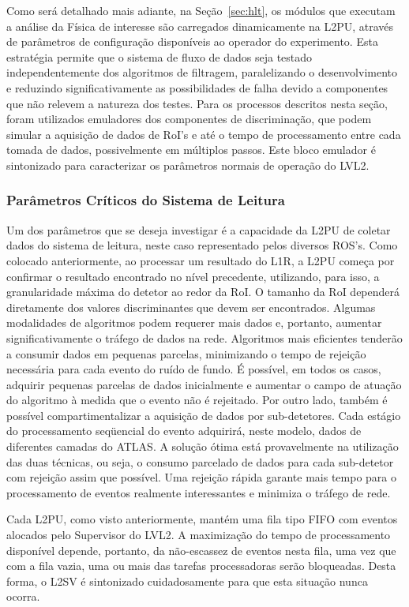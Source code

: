 Como será detalhado mais adiante, na Seção~\ref{sec:hlt}, os módulos que
executam a análise da Física de interesse são carregados dinamicamente na
L2PU, através de parâmetros de configuração disponíveis ao operador do
experimento. Esta estratégia permite que o sistema de fluxo de dados seja
testado independentemente dos algoritmos de filtragem, paralelizando o
desenvolvimento \cite{aa:tns-2004-2} e reduzindo significativamente as
possibilidades de falha devido a componentes que não relevem a natureza dos
testes. Para os processos descritos nesta seção, foram utilizados emuladores
dos componentes de discriminação, que podem simular a aquisição de dados de
RoI's e até o tempo de processamento entre cada tomada de dados, possivelmente
em múltiplos passos. Este bloco emulador é sintonizado para caracterizar os
parâmetros normais de operação do LVL2.

\subsubsection{Parâmetros Críticos do Sistema de Leitura}

Um dos parâmetros que se deseja investigar é a capacidade da L2PU de coletar
dados do sistema de leitura, neste caso representado pelos diversos
ROS's. Como colocado anteriormente, ao processar um resultado do L1R, a L2PU
começa por confirmar o resultado encontrado no nível precedente, utilizando,
para isso, a granularidade máxima do detetor ao redor da RoI. O tamanho da RoI
dependerá diretamente dos valores discriminantes que devem ser
encontrados. Algumas modalidades de algoritmos podem requerer mais dados e,
portanto, aumentar significativamente o tráfego de dados na rede. Algoritmos
mais eficientes tenderão a consumir dados em pequenas parcelas, minimizando o
tempo de rejeição necessária para cada evento do ruído de fundo. É possível,
em todos os casos, adquirir pequenas parcelas de dados inicialmente e aumentar
o campo de atuação do algoritmo à medida que o evento não é rejeitado. Por
outro lado, também é possível compartimentalizar a aquisição de dados por
sub-detetores. Cada estágio do processamento seqüencial do evento adquirirá,
neste modelo, dados de diferentes camadas do ATLAS. A solução ótima está
provavelmente na utilização das duas técnicas, ou seja, o consumo parcelado de
dados para cada sub-detetor com rejeição assim que possível. Uma rejeição
rápida garante mais tempo para o processamento de eventos realmente
interessantes e minimiza o tráfego de rede.

Cada L2PU, como visto anteriormente, mantém uma fila tipo FIFO com eventos
alocados pelo Supervisor do LVL2. A maximização do tempo de processamento
disponível depende, portanto, da não-escassez de eventos nesta fila, uma vez
que com a fila vazia, uma ou mais das tarefas processadoras serão
bloqueadas. Desta forma, o L2SV é sintonizado cuidadosamente para que esta
situação nunca ocorra.

